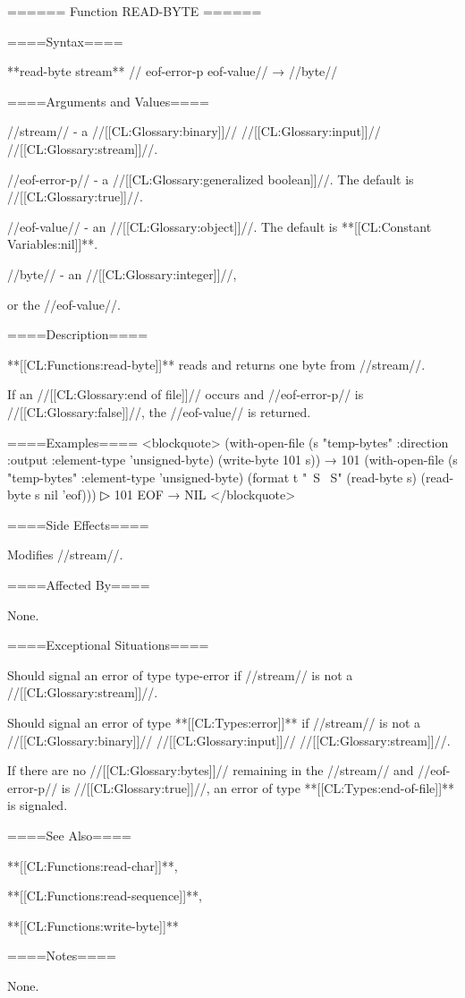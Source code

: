 ====== Function READ-BYTE ======

====Syntax====

**{read-byte} {stream** //\opt} eof-error-p eof-value// → //byte//

====Arguments and Values====

//stream// - a //[[CL:Glossary:binary]]// //[[CL:Glossary:input]]// //[[CL:Glossary:stream]]//.

//eof-error-p// - a //[[CL:Glossary:generalized boolean]]//. The default is //[[CL:Glossary:true]]//.

//eof-value// - an //[[CL:Glossary:object]]//. The default is **[[CL:Constant Variables:nil]]**.

//byte// - an //[[CL:Glossary:integer]]//,

or the //eof-value//.

====Description====

**[[CL:Functions:read-byte]]** reads and returns one byte from //stream//.

If an //[[CL:Glossary:end of file]]// occurs and //eof-error-p// is //[[CL:Glossary:false]]//, the //eof-value// is returned.

====Examples==== <blockquote> (with-open-file (s "temp-bytes" :direction :output :element-type 'unsigned-byte) (write-byte 101 s)) → 101 (with-open-file (s "temp-bytes" :element-type 'unsigned-byte) (format t "~S ~S" (read-byte s) (read-byte s nil 'eof)))
▷ 101 EOF → NIL </blockquote>

====Side Effects====

Modifies //stream//.

====Affected By====

None.

====Exceptional Situations====

Should signal an error of type type-error if //stream// is not a //[[CL:Glossary:stream]]//.

Should signal an error of type **[[CL:Types:error]]** if //stream// is not a //[[CL:Glossary:binary]]// //[[CL:Glossary:input]]// //[[CL:Glossary:stream]]//.

If there are no //[[CL:Glossary:bytes]]// remaining in the //stream// and //eof-error-p// is //[[CL:Glossary:true]]//, an error of type **[[CL:Types:end-of-file]]** is signaled.

====See Also====

**[[CL:Functions:read-char]]**,

**[[CL:Functions:read-sequence]]**,

**[[CL:Functions:write-byte]]**

====Notes====

None.

 
